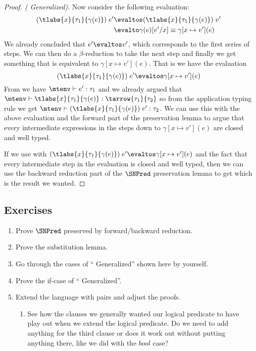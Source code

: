 \begin{proof}[Proof. ( Generalized)]
Now consider the following evaluation:
\begin{align*}
  (\tlabs{x}{\tau_1}{\gamma(e)}) \; e' & \evaltos (\tlabs{x}{\tau_1}{\gamma(e)}) \; v' \\
                                       & \evalto \gamma(e)[v'/x] \equiv
                                                   \gamma[x \mapsto v'](e)
\end{align*}
We already concluded that $e' \evaltos v'$, which corresponds to the first series of steps. We can then do a $\beta$-reduction to take the next step and finally we get something that is equivalent to $\gamma[x \mapsto v'](e)$. That is we have the evaluation
\[
(\tlabs{x}{\tau_1}{\gamma(e)}) \; e' \evaltos \gamma[x \mapsto v'](e)
\]
From  we have $\mtenv \vdash e' : \tau_1$ and we already argued that $\mtenv \vdash \tlabs{x}{\tau_1}{\gamma(e)} : \tarrow{\tau_1}{\tau_2}$ so from the application typing rule we get $\mtenv \vdash (\tlabs{x}{\tau_1}{\gamma(e)}) \; e' : \tau_2$. We can use this with the above evaluation and the forward part of the preservation lemma to argue that every intermediate expressions in the steps down to $\gamma[x \mapsto v'](e)$ are closed and well typed.

If we use  with $(\tlabs{x}{\tau_1}{\gamma(e)}) \; e' \evaltos \gamma[x \mapsto v'](e)$ and the fact that every intermediate step in the evaluation is closed and well typed, then we can use the backward reduction part of the $\SNPred$ preservation lemma to get  which is the result we wanted.

\end{proof}
\subsection*{Exercises}
\begin{enumerate}
\item Prove $\SNPred$ preserved by forward/backward reduction.
\item Prove the substitution lemma.
\item Go through the cases of `` Generalized'' shown here by yourself.
\item Prove the if-case of `` Generalized''.
\item Extend the language with pairs and adjust the proofs.
  \begin{enumerate}
  \item See how the clauses we generally wanted our logical predicate to have play out when we extend the logical predicate. Do we need to add anything for the third clause or does it work out without putting anything there, like we did with the $bool$ case?
  \end{enumerate}
\end{enumerate}
\clearpage
